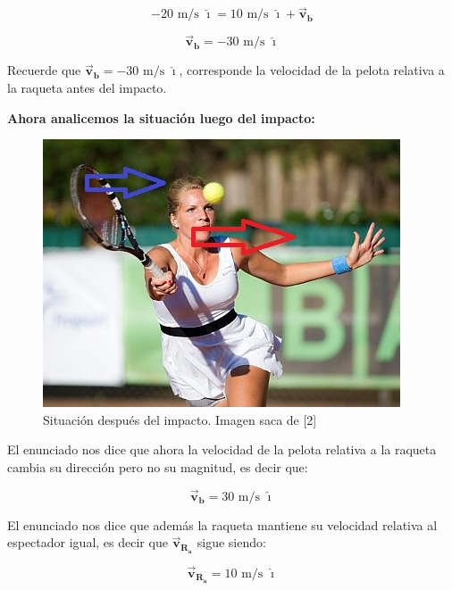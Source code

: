 \documentclass[a4paper,11pt]{article}
\begin{document}
	
	\begin{equation}
	-20 \text{ m/s } \boldsymbol{\hat{\imath}} =  10 \text{ m/s } \boldsymbol{\hat{\imath}} + \vec{\textbf{v}}_{\textbf{b}} 
	\end{equation}
	
	\begin{equation}
	\vec{\textbf{v}}_{\textbf{b}}=  -30 \text{ m/s } \boldsymbol{\hat{\imath}}  
	\end{equation}
	
	Recuerde que  $\vec{\textbf{v}}_{\textbf{b}} = -30  \text{ m/s } \boldsymbol{\hat{\imath}} $, corresponde  la velocidad de la pelota relativa a la raqueta antes del impacto.
	
	
	
	
	 \textbf{Ahora analicemos la situación luego del impacto:} 
	
	
	\begin{figure}[h]
		\includegraphics[width=1.0\linewidth]{./im/ten2}
		\caption{Situación después del impacto. Imagen saca de [2]}
	\end{figure}
	
	El enunciado nos dice que ahora la velocidad de la pelota relativa a la raqueta cambia su dirección pero no su magnitud, es decir que:
	
	$$\vec{\textbf{v}}_{\textbf{b}} = 30  \text{ m/s } \boldsymbol{\hat{\imath}} $$
	
	El enunciado nos dice que además la raqueta mantiene su velocidad relativa al espectador igual, es decir que $\vec{\textbf{v}}_{\textbf{R}_\textbf{a}}$ sigue siendo:
	
	$$ \vec{\textbf{v}}_{\textbf{R}_\textbf{a}} = 10 \text{ m/s } \boldsymbol{\hat{\imath}} $$
	
\end{document}
